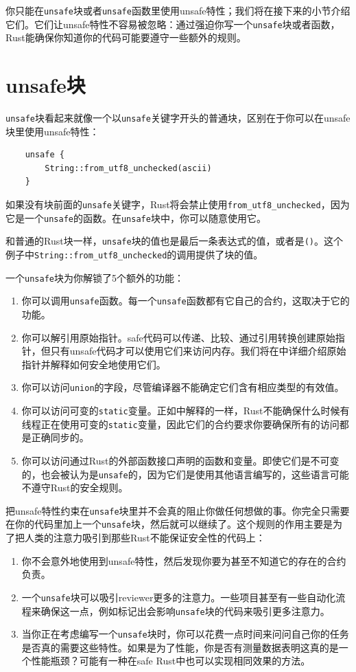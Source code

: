 你只能在\texttt{unsafe}块或者\texttt{unsafe}函数里使用unsafe特性；我们将在接下来的小节介绍它们。它们让unsafe特性不容易被忽略：通过强迫你写一个\texttt{unsafe}块或者函数，Rust能确保你知道你的代码可能要遵守一些额外的规则。

\section{unsafe块}
\texttt{unsafe}块看起来就像一个以\texttt{unsafe}关键字开头的普通块，区别在于你可以在unsafe块里使用unsafe特性：
\begin{verbatim}
    unsafe {
        String::from_utf8_unchecked(ascii)
    }
\end{verbatim}

如果没有块前面的\texttt{unsafe}关键字，Rust将会禁止使用\texttt{from\_utf8\_unchecked}，因为它是一个\texttt{unsafe}的函数。在\texttt{unsafe}块中，你可以随意使用它。

和普通的Rust块一样，\texttt{unsafe}块的值也是最后一条表达式的值，或者是\texttt{()}。这个例子中\texttt{String::from\_utf8\_unchecked}的调用提供了块的值。

一个\texttt{unsafe}块为你解锁了5个额外的功能：
\begin{enumerate}
    \item 你可以调用\texttt{unsafe}函数。每一个\texttt{unsafe}函数都有它自己的合约，这取决于它的功能。
    \item 你可以解引用原始指针。safe代码可以传递、比较、通过引用转换创建原始指针，但只有unsafe代码才可以使用它们来访问内存。我们将在中详细介绍原始指针并解释如何安全地使用它们。
    \item 你可以访问\texttt{union}的字段，尽管编译器不能确定它们含有相应类型的有效值。
    \item 你可以访问可变的\texttt{static}变量。正如中解释的一样，Rust不能确保什么时候有线程正在使用可变的\texttt{static}变量，因此它们的合约要求你要确保所有的访问都是正确同步的。
    \item 你可以访问通过Rust的外部函数接口声明的函数和变量。即使它们是不可变的，也会被认为是\texttt{unsafe}的，因为它们是使用其他语言编写的，这些语言可能不遵守Rust的安全规则。
\end{enumerate}

把unsafe特性约束在\texttt{unsafe}块里并不会真的阻止你做任何想做的事。你完全只需要在你的代码里加上一个\texttt{unsafe}块，然后就可以继续了。这个规则的作用主要是为了把人类的注意力吸引到那些Rust不能保证安全性的代码上：
\begin{enumerate}
    \item 你不会意外地使用到unsafe特性，然后发现你要为甚至不知道它的存在的合约负责。
    \item 一个\texttt{unsafe}块可以吸引reviewer更多的注意力。一些项目甚至有一些自动化流程来确保这一点，例如标记出会影响\texttt{unsafe}块的代码来吸引更多注意力。
    \item 当你正在考虑编写一个\texttt{unsafe}块时，你可以花费一点时间来问问自己你的任务是否真的需要这些特性。如果是为了性能，你是否有测量数据表明这真的是一个性能瓶颈？可能有一种在safe Rust中也可以实现相同效果的方法。
\end{enumerate}

